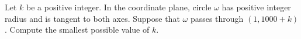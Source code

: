 Let $k$ be a positive integer. In the coordinate plane, circle $\omega$ has positive integer radius and is tangent to both axes. Suppose that $\omega$ passes through $(1,1000+k)$. Compute the smallest possible value of $k$.
